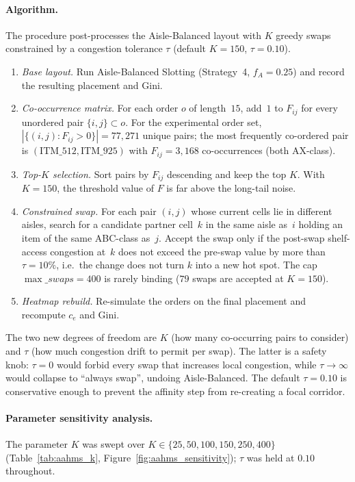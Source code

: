 \documentclass[12pt,a4paper]{article}
\begin{document}
\paragraph{Algorithm.}
The procedure post-processes the Aisle-Balanced layout with $K$ greedy swaps
constrained by a congestion tolerance $\tau$ (default $K = 150$, $\tau = 0.10$).
\begin{enumerate}
  \item \emph{Base layout.}
        Run Aisle-Balanced Slotting (Strategy~4, $f_A = 0.25$) and record the
        resulting placement and Gini.
  \item \emph{Co-occurrence matrix.}
        For each order $o$ of length~$15$, add~$1$ to $F_{ij}$ for every unordered
        pair $\{i,j\} \subset o$.
        For the experimental order set, $|\{(i,j) : F_{ij} > 0\}| = 77{,}271$
        unique pairs; the most frequently co-ordered pair is
        $(\mathrm{ITM\_512}, \mathrm{ITM\_925})$ with $F_{ij} = 3{,}168$
        co-occurrences (both AX-class).
  \item \emph{Top-$K$ selection.}
        Sort pairs by $F_{ij}$ descending and keep the top $K$.
        With $K = 150$, the threshold value of $F$ is far above the long-tail noise.
  \item \emph{Constrained swap.}
        For each pair $(i,j)$ whose current cells lie in different aisles, search
        for a candidate partner cell~$k$ in the same aisle as~$i$ holding an item
        of the same ABC-class as~$j$.
        Accept the swap only if the post-swap shelf-access congestion at~$k$
        does not exceed the pre-swap value by more than $\tau = 10\%$, i.e.\ the
        change does not turn $k$ into a new hot spot.
        The cap $\max\_swaps = 400$ is rarely binding ($79$ swaps are accepted
        at $K = 150$).
  \item \emph{Heatmap rebuild.}
        Re-simulate the orders on the final placement and recompute $c_e$ and Gini.
\end{enumerate}
The two new degrees of freedom are $K$ (how many co-occurring pairs to consider)
and $\tau$ (how much congestion drift to permit per swap).
The latter is a safety knob: $\tau = 0$ would forbid every swap that increases
local congestion, while $\tau \to \infty$ would collapse to ``always swap'', undoing
Aisle-Balanced.
The default $\tau = 0.10$ is conservative enough to prevent the affinity step from
re-creating a focal corridor.

\paragraph{Parameter sensitivity analysis.}
The parameter $K$ was swept over $K \in \{25, 50, 100, 150, 250, 400\}$
(Table~\ref{tab:aahms_k}, Figure~\ref{fig:aahms_sensitivity}); $\tau$ was held
at $0.10$ throughout.
\end{document}
